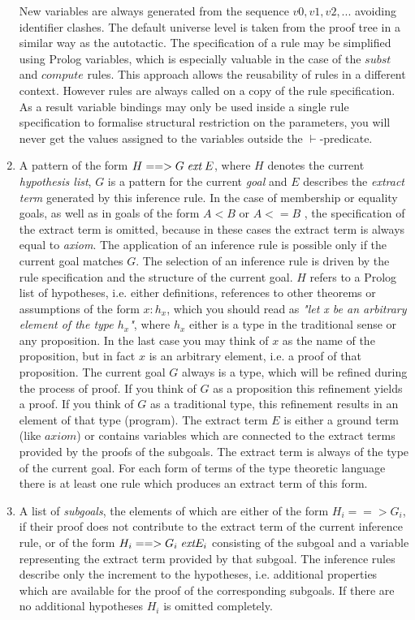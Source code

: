 \documentclass[11pt]{report}
\begin{document}
\begin{enumerate}
 New variables are always generated
 from the sequence $v0, v1, v2, ...$ avoiding identifier clashes.
 The default universe level is taken from the proof tree in
 a similar way as the autotactic.
 The specification of a rule may be simplified using Prolog
 variables, which is especially valuable in the case of the
 $subst$ and $compute$ rules. This approach allows the reusability 
 of rules in a different context. However rules are always called on 
 a copy of the rule specification. As a result variable bindings
 may only be used inside a single rule specification to formalise
 structural restriction on the parameters, you will never get the
 values assigned to the variables outside the $\vdash$-predicate.
 \item
 A pattern of the form $H==>G\; \mbox{\it ext} \; E$, where $H$ denotes the
 current \emph{hypothesis list}, $G$ is a pattern for the current
 \emph{goal} and $E$ describes the \emph{extract term} generated by this
 inference rule. 
 In the case of membership or equality goals, as well as in
 goals of the form $A$$<$$B$ or $A$$<=B$ , the specification 
 of the extract term is omitted, because in these cases the
 extract term is always equal to \emph{axiom}.
 The application of an inference rule is
 possible only if the current goal matches $G$.
 The selection of an inference 
 rule is driven by the rule specification and the structure
 of the current goal.
 $H$ refers to a Prolog list of hypotheses, i.e. either
 definitions, references to other theorems or assumptions 
 of the form $x:h_x$,
 which you should read as \emph{"let x be an arbitrary element
 of the type $h_x$"}, where $h_x$ either is a type in the
 traditional sense or any proposition. In the last case you may 
 think of $x$ as the name of the proposition, but in fact 
 $x$ is an arbitrary element, i.e. a proof of that proposition.
 The current goal $G$ always is a type, which will be
 refined during the process of proof. If you think of $G$ as a
 proposition this refinement yields a proof. If you think of $G$
 as a traditional type, this refinement results in an element of
 that type (program).
 The extract term $E$ is either a ground term (like $axiom$)
 or contains variables which are connected to the extract
 terms provided by the proofs of the subgoals. The extract term
 is always of the type of the current goal. For each form of terms
 of the type theoretic language there is at least one rule which
 produces an extract term of this form.
 \item
 A list of \emph{subgoals}, the elements of which are
 either of the form $H_i==>G_i$, if their proof does not 
 contribute to
 the extract term of the current inference rule, or of the form
 $H_i==>G_i\; \mbox{\it ext} E_i$
 consisting of the subgoal and a variable representing
 the extract term provided by that subgoal. The inference rules
 describe only the increment to the hypotheses, i.e. additional
 properties which are available for the proof of the corresponding
 subgoals. If there are no additional hypotheses $H_i$
 is omitted completely. 
 \end{enumerate}
  
\end{document}
